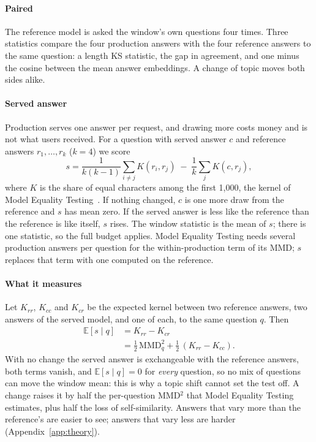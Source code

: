 \documentclass{article}
\begin{document}
\paragraph{Paired} The reference model is asked the window's own questions four
times. Three statistics compare the four production answers with the four
reference answers to the same question: a length KS statistic, the gap in
agreement, and one minus the cosine between the mean answer embeddings. A change of
topic moves both sides alike.

\paragraph{Served answer}
\label{sec:served}
Production serves one answer per request, and drawing more costs money and is not
what users received. For a question with served answer $c$ and reference answers
$r_1,\dots,r_k$ ($k=4$) we score
\[
  s = \frac{1}{k(k-1)}\sum_{i\neq j} K(r_i,r_j) \;-\; \frac{1}{k}\sum_{j} K(c,r_j),
\]
where $K$ is the share of equal characters among the first 1{,}000, the kernel of
Model Equality Testing~\citep{gao2025model}. If nothing changed, $c$ is one more
draw from the reference and $s$ has mean zero. If the served answer is less like
the reference than the reference is like itself, $s$ rises. The window statistic is
the mean of $s$; there is one statistic, so the full budget applies. Model Equality
Testing needs several production answers per question for the within-production
term of its MMD; $s$ replaces that term with one computed on the reference.

\paragraph{What it measures} Let $K_{rr}$, $K_{cc}$ and $K_{cr}$ be the expected
kernel between two reference answers, two answers of the served model, and one of
each, to the same question $q$. Then
\begin{align*}
  \mathbb{E}[s\mid q] &= K_{rr}-K_{cr}\\
  &= \tfrac12\,\mathrm{MMD}^2_q + \tfrac12\,(K_{rr}-K_{cc}).
\end{align*}
With no change the served answer is exchangeable with the reference answers, both
terms vanish, and $\mathbb{E}[s\mid q]=0$ for \emph{every} question, so no mix of
questions can move the window mean: this is why a topic shift cannot set the test
off. A change raises it by half the per-question MMD$^2$ that Model Equality Testing
estimates, plus half the loss of self-similarity. Answers that vary more than the
reference's are easier to see; answers that vary less are harder
(Appendix~\ref{app:theory}).
\end{document}
